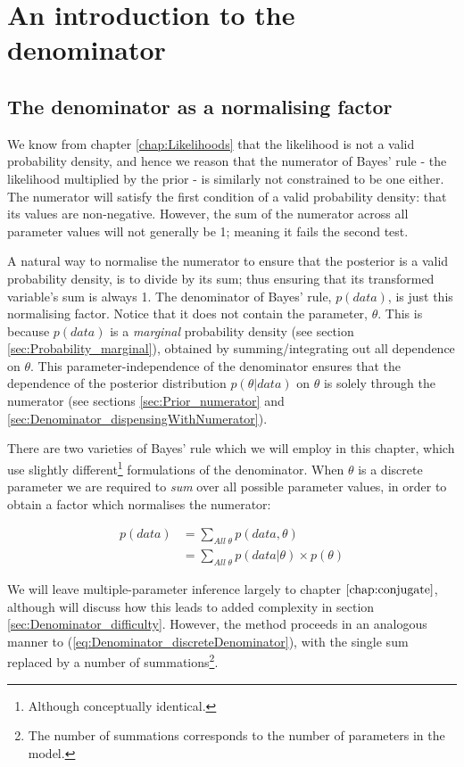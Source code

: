 \documentclass[11pt,fullpage]{book}
\begin{document}
\section{An introduction to the denominator}
\subsection{The denominator as a normalising factor}
We know from chapter \ref{chap:Likelihoods} that the likelihood is not a valid probability density, and hence we reason that the numerator of Bayes' rule - the likelihood multiplied by the prior - is similarly not constrained to be one either. The numerator will satisfy the first condition of a valid probability density: that its values are non-negative. However, the sum of the numerator across all parameter values will not generally be 1; meaning it fails the second test.

A natural way to normalise the numerator to ensure that the posterior is a valid probability density, is to divide by its sum; thus ensuring that its transformed variable's sum is always 1. The denominator of Bayes' rule, $p(data)$, is just this normalising factor. Notice that it does not contain the parameter, $\theta$. This is because $p(data)$ is a \textit{marginal} probability density (see section \ref{sec:Probability_marginal}), obtained by summing/integrating out all dependence on $\theta$. This parameter-independence of the denominator ensures that the dependence of the posterior distribution $p(\theta|data)$ on $\theta$ is solely through the numerator (see sections \ref{sec:Prior_numerator} and \ref{sec:Denominator_dispensingWithNumerator}). 

There are two varieties of Bayes' rule which we will employ in this chapter, which use slightly different\footnote{Although conceptually identical.} formulations of the denominator. When $\theta$ is a discrete parameter we are required to \textit{sum} over all possible parameter values, in order to obtain a factor which normalises the numerator:

\begin{equation}\label{eq:Denominator_discreteDenominator}
\begin{align}
p(data) &= \sum\limits_{All\;\theta} p(data,\theta)\\ 
&= \sum\limits_{All\;\theta} p(data|\theta) \times p(\theta)
\end{align}
\end{equation}

We will leave multiple-parameter inference largely to chapter $\ref{chap:conjugate}$, although will discuss how this leads to added complexity in section \ref{sec:Denominator_difficulty}. However, the method proceeds in an analogous manner to (\ref{eq:Denominator_discreteDenominator}), with the single sum replaced by a number of summations\footnote{The number of summations corresponds to the number of parameters in the model.}.
\end{document}
